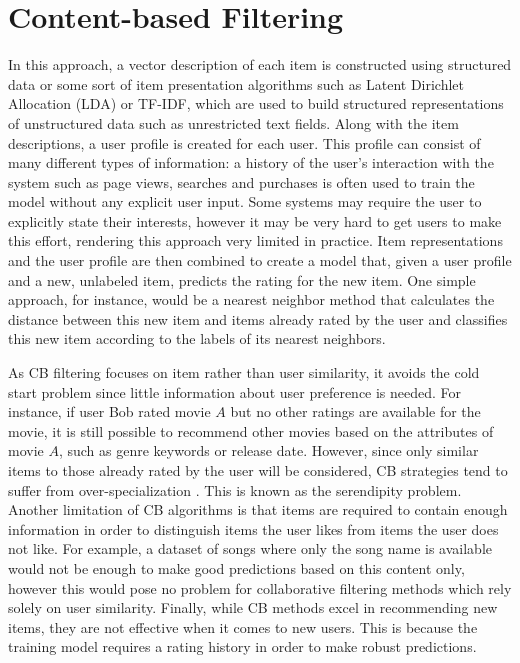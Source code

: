 \documentclass[cic,tc,english]{iiufrgs}
\begin{document}
\section{Content-based Filtering} \label{cb}
In this approach, a vector description of each item is constructed using structured data or some sort of item presentation algorithms such as Latent Dirichlet Allocation (LDA) or TF-IDF, which are used to build structured representations of unstructured data such as unrestricted text fields. Along with the item descriptions, a user profile is created for each user. This profile can consist of many different types of information: a history of the user's interaction with the system such as page views, searches and purchases is often used to train the model without any explicit user input. Some systems may require the user to explicitly state their interests, however it may be very hard to get users to make this effort, rendering this approach very limited in practice. Item representations and the user profile are then combined to create a model that, given a user profile and a new, unlabeled item, predicts the rating for the new item. One simple approach, for instance, would be a nearest neighbor method that calculates the distance between this new item and items already rated by the user and classifies this new item according to the labels of its nearest neighbors.

As CB filtering focuses on item rather than user similarity, it avoids the cold start problem since little information about user preference is needed. For instance, if user Bob rated movie $A$ but no other ratings are available for the movie, it is still possible to recommend other movies based on the attributes of movie $A$, such as genre keywords or release date. However, since only similar items to those already rated by the user will be considered, CB strategies tend to suffer from over-specialization \cite{Iaquinta2008}. This is known as the serendipity problem. Another limitation of CB algorithms is that items are required to contain enough information in order to distinguish items the user likes from items the user does not like. For example, a dataset of songs where only the song name is available would not be enough to make good predictions based on this content only, however this would pose no problem for collaborative filtering methods which rely solely on user similarity. Finally, while CB methods excel in recommending new items, they are not effective when it comes to new users. This is because the training model requires a rating history in order to make robust predictions.
\end{document}
